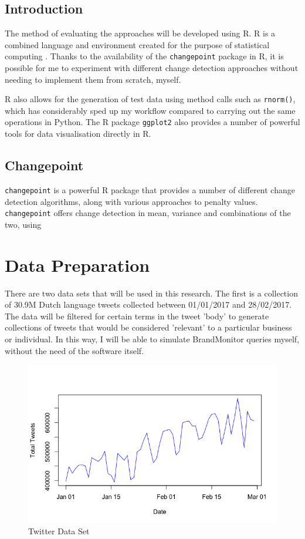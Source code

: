 \documentclass{uvamscse}	%
\begin{document}
\subsection{Introduction}

The method of evaluating the approaches will be developed using R. R is a combined language and environment created for the purpose of statistical computing \cite{RCoreTeam2017}. Thanks to the availability of the \texttt{changepoint} package in R\cite{Killick2014}, it is possible for me to experiment with different change detection approaches without needing to implement them from scratch, myself.

R also allows for the generation of test data using method calls such as \texttt{rnorm()}, which has considerably sped up my workflow compared to carrying out the same operations in Python. The R package \texttt{ggplot2} \cite{Wickham2009} also provides a number of powerful tools for data visualisation directly in R.

\subsection{Changepoint}

\texttt{changepoint} is a powerful R package that provides a number of different change detection algorithms, along with various approaches to penalty values. \texttt{changepoint} offers change detection in mean, variance and combinations of the two, using 

\section{Data Preparation}

There are two data sets that will be used in this research. The first is a collection of 30.9M Dutch language tweets collected between 01/01/2017 and 28/02/2017. The data will be filtered for certain terms in the tweet 'body' to generate collections of tweets that would be considered 'relevant' to a particular business or individual. In this way, I will be able to simulate BrandMonitor queries myself, without the need of the software itself.

\begin{figure}[t]
	\includegraphics[scale=0.5]{figures/twitter-totals-full.png}
	\centering
	\caption{Twitter Data Set}
	\label{fig:totals_graph}
\end{figure}
\end{document}

